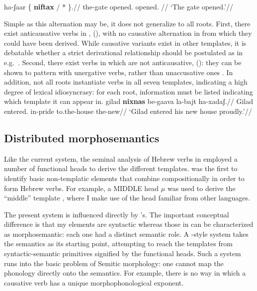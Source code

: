 	\a \begingl
		\gla ha-ʃaar \{ \textbf{niftax} / * \}.//
		\glb the-gate {} opened. {} \phantom{*}opened. {}//
		\glft `The gate opened.'//
		\endgl
\xe

Simple as this alternation may be, it does not generalize to all roots. First, there exist anticausative verbs in {\tnif}, (\nextx), with no causative alternation in {\tkal} from which they could have been derived. While causative variants exist in other templates, it is debatable whether a strict derivational relationship should be postulated as in e.g.~\cite{laks13morpho}. Second, there exist verbs in {\tnif} which are not anticausative, (\anextx): they can be shown to pattern with unergative verbs, rather than unaccusative ones \citep{kastner16phd}. In addition, not all roots instantiate verbs in all seven templates, indicating a high degree of lexical idiosyncrasy: for each root, information must be listed indicating which template it can appear in.
\ex{}
\xe
\ex
	\begingl
		\gla gilad \textbf{nixnas} be-gaava la-bajt ha-xadaʃ.//
		\glb Gilad entered. in-pride to.the-house the-new//
		\glft `Gilad entered his new house proudly.'//
		\endgl
\xe



	\subsection{Distributed morphosemantics \citep{doron03}} \label{sec:others-heb:ed}
Like the current system, the seminal analysis of Hebrew verbs in \cite{doron03} employed a number of functional heads to derive the different templates. \cite{doron03} was the first to identify basic non-templatic elements that combine compositionally in order to form Hebrew verbs. For example, a MIDDLE head $\mu$ was used to derive the ``middle'' template {\tnif}, where I make use of the head {\vz} familiar from other languages.

The present system is influenced directly by \citeauthor{doron03}'s. The important conceptual difference is that my elements are syntactic whereas those in \cite{doron03} can be characterized as morphosemantic: each one had a distinct semantic role. A \citeauthor{doron03}-style system takes the semantics as its starting point, attempting to reach the templates from syntactic-semantic primitives signified by the functional heads. Such a system runs into the basic problem of Semitic morphology: one cannot map the phonology directly onto the semantics. For example, there is no way in which a causative verb has a unique morphophonological exponent.


